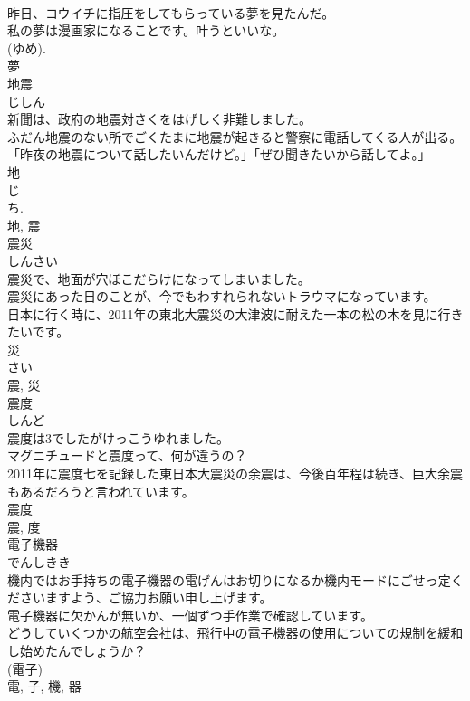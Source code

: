 \documentclass[8pt]{extreport}
\begin{document}
\begin{CJK}{UTF8}{min}
\\	昨日、コウイチに指圧をしてもらっている夢を見たんだ。	
\\	私の夢は漫画家になることです。叶うといいな。	
\\	(ゆめ). 
\\	夢	
\\	地震	
\\	じしん	
\\	新聞は、政府の地震対さくをはげしく非難しました。	
\\	ふだん地震のない所でごくたまに地震が起きると警察に電話してくる人が出る。	
\\	「昨夜の地震について話したいんだけど。」「ぜひ聞きたいから話してよ。」	
\\	地 
\\	じ 
\\	ち. 
\\	地, 震	
\\	震災	
\\	しんさい	
\\	震災で、地面が穴ぼこだらけになってしまいました。	
\\	震災にあった日のことが、今でもわすれられないトラウマになっています。	
\\	日本に行く時に、2011年の東北大震災の大津波に耐えた一本の松の木を見に行きたいです。	
\\	災 
\\	さい 
\\	震, 災	
\\	震度	
\\	しんど	
\\	震度は3でしたがけっこうゆれました。	
\\	マグニチュードと震度って、何が違うの？	
\\	2011年に震度七を記録した東日本大震災の余震は、今後百年程は続き、巨大余震もあるだろうと言われています。	
\\	震度 
\\	震, 度	
\\	電子機器	
\\	でんしきき	
\\	機内ではお手持ちの電子機器の電げんはお切りになるか機内モードにごせっ定くださいますよう、ご協力お願い申し上げます。	
\\	電子機器に欠かんが無いか、一個ずつ手作業で確認しています。	
\\	どうしていくつかの航空会社は、飛行中の電子機器の使用についての規制を緩和し始めたんでしょうか？	
\\	(電子) 
\\	電, 子, 機, 器	

\end{CJK}
\end{document}
